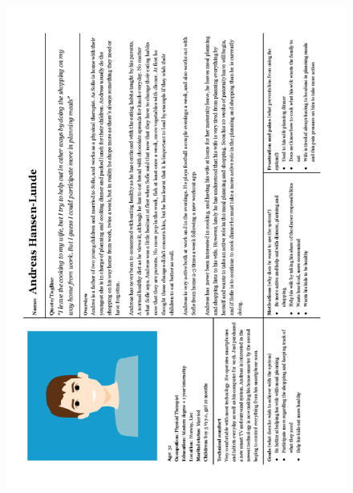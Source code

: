     \begin{figure}[H]
        \centering
        \includegraphics[scale=0.7]{figures/malepers.png}
    \end{figure} 
    
